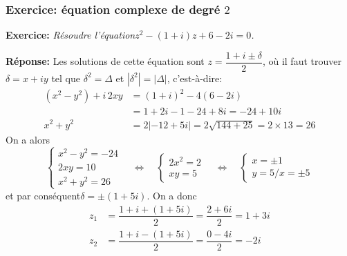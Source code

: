 
\begin{frame}%
\frametitle{\bf Exercice: \'equation complexe de degr\'e $2$} 
\medskip 

{\bf Exercice:} 
{\it R\'esoudre l'\'equation\quad $z^2-(1+i)z+6-2i=0$.}
\vspace*{1.5mm}

\pause
{\bf R\'eponse:} 
Les solutions de cette \'equation sont\quad 
$z=\dfrac{1+i\pm\delta}{2}$, o\`u il faut trouver $\delta=x+iy$ 
tel que $\delta^2=\Delta$ et  
$\left|\delta^2\right|=\left|\Delta \right|$, 
\pause 
c'est-\`a-dire:
\begin{align*}
(x^2-y^2)+i\,2xy & = (1+i)^2-4(6-2i) \\ 
& = 1+2i-1-24+8i = -24+10i \\ 
x^2+y^2 & = 2 \left|-12+5i \right| = 2\sqrt{144+25} = 2\times 13 =26
\end{align*}
\pause 
On a alors
$$
\left\{\begin{array}{l} 
x^2-y^2 = -24 \\ 2xy=10 \\ x^2+y^2=26 
\end{array}\right. 
\quad \Leftrightarrow\quad 
\left\{\begin{array}{l} 
2x^2 = 2 \\ xy=5 
\end{array}\right. 
\quad \Leftrightarrow\quad 
\left\{\begin{array}{l} 
x = \pm 1 \\ y=5/x=\pm 5
\end{array}\right. 
$$
et par cons\'equent\quad $\delta = \pm (1+5i)$. 
\pause
On a donc 
\begin{align*}
z_1 & =\dfrac{1+i+(1+5i)}{2} = \dfrac{2+6i}{2}=1+3i \\ 
z_2 & =\dfrac{1+i-(1+5i)}{2} = \dfrac{0-4i}{2}=-2i
\end{align*}

\end{frame}


